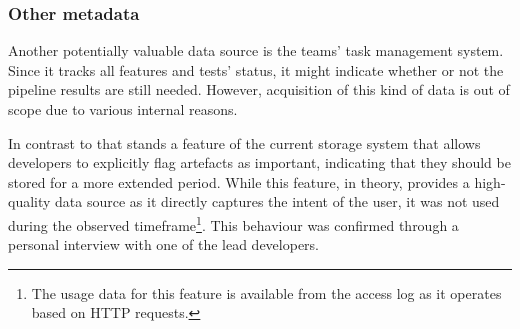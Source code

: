 
\subsubsection{Other metadata}
    Another potentially valuable data source is the teams' task management system. Since it tracks all features and tests' status, it might indicate whether or not the pipeline results are still needed. However, acquisition of this kind of data is out of scope due to various internal reasons.
    
    In contrast to that stands a feature of the current storage system that allows developers to explicitly flag artefacts as important, indicating that they should be stored for a more extended period. While this feature, in theory, provides a high-quality data source as it directly captures the intent of the user, it was not used during the observed timeframe\footnote{The usage data for this feature is available from the access log as it operates based on HTTP requests.}. This behaviour was confirmed through a personal interview with one of the lead developers.

